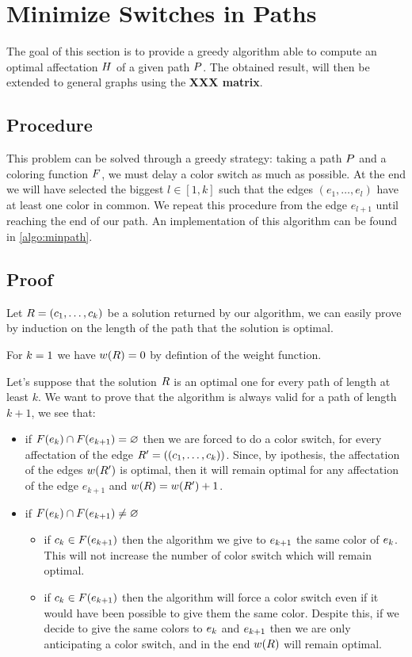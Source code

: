 \section{Minimize Switches in Paths}

The goal of this section is to provide a greedy algorithm able to compute an optimal affectation $H$ of a given path $P$. The obtained result, will then be extended to general graphs using the \textbf{XXX matrix}.

\subsection{Procedure}
\label{sec:path_proc}
This problem can be solved through a greedy strategy: taking a path $P$ and a coloring function $F$, we must delay a color switch as much as possible. At the end we will have selected the biggest $l \in [1, k]$ such that the edges $(e_1, \dots, e_l)$ have at least one color in common. We repeat this procedure from the edge $e_{l+1}$ until reaching the end of our path. An implementation of this algorithm can be found in \cref{algo:minpath}.

\subsection{Proof}

Let $R = (c_1,\ldots,c_{k})$ be a solution returned by our algorithm, we can easily prove by induction on the length of the path that the solution is optimal.

For $k = 1$ we have $w(R) = 0$ by defintion of the weight function.

Let's suppose that the solution $R$ is an optimal one for every path of length at least $k$. We want to prove that the algorithm is always valid for a path of length $k+1$, we see that:

\begin{itemize}
  \item if $F(e_k) \cap F(e_{k+1}) = \varnothing$ then we are forced to do a color switch, for every affectation of the edge $R' = ((c_1,\ldots,c_{k}))$. Since, by ipothesis, the affectation of the edges $w(R')$ is optimal, then it will remain optimal for any affectation of the edge $e_{k+1}$ and $w(R) = w(R') + 1$.
  \item if $F(e_k) \cap F(e_{k+1}) \neq \varnothing$
        \begin{itemize}
          \item if $c_k \in F(e_{k+1})$ then the algorithm we give to $e_{k+1}$ the same color of $e_{k}$. This will not increase the number of color switch which will remain optimal.
          \item if $c_k \in F(e_{k+1})$ then the algorithm will force a color switch even if it would have been possible to give them the same color. Despite this, if we decide to give the same colors to $e_k$ and $e_{k+1}$ then we are only anticipating a color switch, and in the end $w(R)$ will remain optimal.
        \end{itemize}
\end{itemize}

